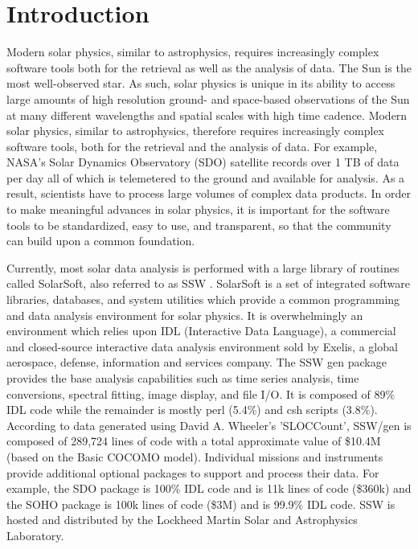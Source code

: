 \section{Introduction}
Modern solar physics, similar to astrophysics, requires increasingly 
complex software tools both for the retrieval as well as the analysis 
of data. The Sun is the most well-observed star. As such, solar 
physics is unique in its ability to access large amounts of high 
resolution ground- and space-based observations of the Sun at many 
different wavelengths and spatial scales with high time cadence. 
Modern solar physics, similar to astrophysics, therefore requires 
increasingly complex software tools, both for the retrieval and the 
analysis of data. For example, NASA's Solar Dynamics Observatory 
(SDO) satellite records over 1 TB of data per day all of which is 
telemetered to the ground and available for analysis. As a result, 
scientists have to process large volumes of complex data products. In 
order to make meaningful advances in solar physics, it is important 
for the software tools to be standardized, easy to use, and 
transparent, so that the community can build upon a common foundation.

Currently, most solar data analysis is performed with a large library 
of routines called SolarSoft, also referred to as SSW 
\cite{freeland1998}. SolarSoft is a set of integrated software 
libraries, databases, and system utilities which provide a common 
programming and data analysis environment for solar physics. It is 
overwhelmingly an environment which relies upon IDL (Interactive Data 
Language), a commercial and closed-source interactive data analysis 
environment sold by Exelis, a global aerospace, defense, information 
and services company. The SSW gen package provides the base analysis 
capabilities such as time series analysis, time conversions, spectral 
fitting, image display, and file I/O. It is composed of 89\% IDL code 
while the remainder is mostly perl (5.4\%) and csh scripts (3.8\%). 
According to data generated using David A. Wheeler's 'SLOCCount', 
SSW/gen is composed of 289,724 lines of code with a total approximate 
value of \$10.4M (based on the Basic COCOMO model). Individual 
missions and instruments provide additional optional packages to 
support and process their data. For example, the SDO package 
\cite{sdo} is 100\% IDL code and is 11k lines of code (\$360k) 
and the SOHO package \cite{soho} is 100k lines of code (\$3M) and is 
99.9\% IDL code. SSW is hosted and distributed by the Lockheed Martin 
Solar and Astrophysics Laboratory.


